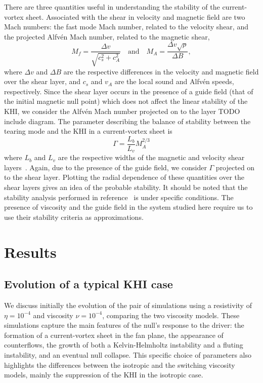 There are three quantities useful in understanding the stability of the current-vortex sheet. Associated with the shear in velocity and magnetic field are two Mach numbers: the fast mode Mach number, related to the velocity shear, and the projected Alfv\'en Mach number, related to the magnetic shear,
\begin{equation}
  \label{eq:mach_numbers}
  M_f = \frac{\Delta v}{\sqrt{c_s^2 + c_A^2}} \quad \text{and} \quad M_A = \frac{\Delta v \sqrt{\rho}}{\Delta B},
\end{equation}
where $\Delta v$ and $\Delta B$ are the respective differences in the velocity and magnetic field over the shear layer, and $c_s$ and $v_A$ are the local sound and Alfv\'en speeds, respectively. Since the shear layer occurs in the presence of a guide field (that of the initial magnetic null point) which does not affect the linear stability of the KHI, we consider the Alfv\'en Mach number projected on to the layer TODO include diagram. The parameter describing the balance of stability between the tearing mode and the KHI in a current-vortex sheet is
\begin{equation}
  \label{eq:khi_stability_param}
  \Gamma = \frac{L_b}{L_v} M_A^{2/3}
\end{equation}
where $L_b$ and $L_v$ are the respective widths of the magnetic and velocity shear layers~\cite{einaudiResistiveInstabilitiesFlowing1986}. Again, due to the presence of the guide field, we consider $\Gamma$ projected on to the shear layer. Plotting the radial dependence of these quantities over the shear layers gives an idea of the probable stability. It should be noted that the stability analysis performed in reference~\cite{einaudiResistiveInstabilitiesFlowing1986} is under specific conditions. The presence of viscosity and the guide field in the system studied here require us to use their stability criteria as approximations.

\section{Results}

\subsection{Evolution of a typical KHI case}
\label{sec:null_point_khi_single_case}

We discuss initially the evolution of the pair of simulations using a resistivity of $\eta = 10^{-4}$ and viscosity $\nu = 10^{-4}$, comparing the two viscosity models. These simulations capture the main features of the null's response to the driver: the formation of a current-vortex sheet in the fan plane, the appearance of counterflows, the growth of both a Kelvin-Helmholtz instability and a fluting instability, and an eventual null collapse. This specific choice of parameters also highlights the differences between the isotropic and the switching viscosity models, mainly the suppression of the KHI in the isotropic case.

